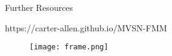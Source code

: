 \documentclass[final]{beamer}
\newlength{\onecolwid}
\begin{document}
\begin{frame}[t]
\begin{columns}[t]
\begin{column}{\onecolwid}




\begin{alertblock}{Further Resources}

\centering
https://carter-allen.github.io/MVSN-FMM

\begin{figure}
\texttt{[image: frame.png]}
\end{figure}

\end{alertblock}


\end{column} %

\end{columns} %

\end{frame} %
\end{document}
